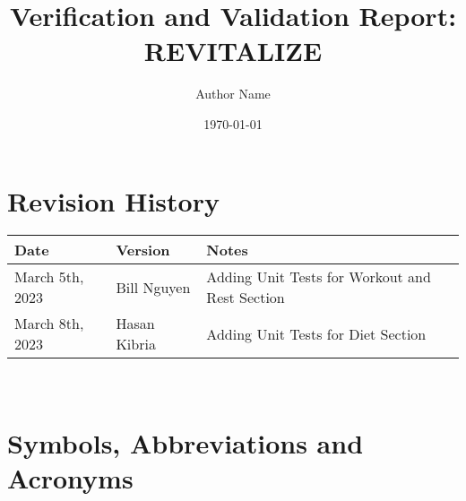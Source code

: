 \documentclass[12pt, titlepage]{article}
\begin{document}
\title{Verification and Validation Report: REVITALIZE} 
\author{Author Name}
\date{\today}

\maketitle


\section{Revision History}

\begin{tabularx}{\textwidth}{p{3cm}p{2cm}X}
	\toprule {\bf Date} & {\bf Version} & {\bf Notes}\\
	\midrule
	March 5th, 2023 & Bill Nguyen & Adding Unit Tests for Workout and Rest Section\\
	March 8th, 2023 & Hasan Kibria & Adding Unit Tests for Diet Section\\
	\bottomrule
\end{tabularx}

~\newpage

\section{Symbols, Abbreviations and Acronyms}
\end{document}
